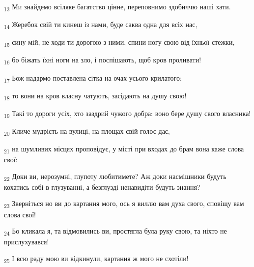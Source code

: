 \begin{tcolorbox}
\textsubscript{13} Ми знайдемо всіляке багатство цінне, переповнимо здобиччю наші хати.
\end{tcolorbox}
\begin{tcolorbox}
\textsubscript{14} Жеребок свій ти кинеш із нами, буде саква одна для всіх нас,
\end{tcolorbox}
\begin{tcolorbox}
\textsubscript{15} сину мій, не ходи ти дорогою з ними, спини ногу свою від їхньої стежки,
\end{tcolorbox}
\begin{tcolorbox}
\textsubscript{16} бо біжать їхні ноги на зло, і поспішають, щоб кров проливати!
\end{tcolorbox}
\begin{tcolorbox}
\textsubscript{17} Бож надармо поставлена сітка на очах усього крилатого:
\end{tcolorbox}
\begin{tcolorbox}
\textsubscript{18} то вони на кров власну чатують, засідають на душу свою!
\end{tcolorbox}
\begin{tcolorbox}
\textsubscript{19} Такі то дороги усіх, хто заздрий чужого добра: воно бере душу свого власника!
\end{tcolorbox}
\begin{tcolorbox}
\textsubscript{20} Кличе мудрість на вулиці, на площах свій голос дає,
\end{tcolorbox}
\begin{tcolorbox}
\textsubscript{21} на шумливих місцях проповідує, у місті при входах до брам вона каже слова свої:
\end{tcolorbox}
\begin{tcolorbox}
\textsubscript{22} Доки ви, нерозумні, глупоту любитимете? Аж доки насмішники будуть кохатись собі в глузуванні, а безглузді ненавидіти будуть знання?
\end{tcolorbox}
\begin{tcolorbox}
\textsubscript{23} Зверніться но ви до картання мого, ось я виллю вам духа свого, сповіщу вам слова свої!
\end{tcolorbox}
\begin{tcolorbox}
\textsubscript{24} Бо кликала я, та відмовились ви, простягла була руку свою, та ніхто не прислухувався!
\end{tcolorbox}
\begin{tcolorbox}
\textsubscript{25} І всю раду мою ви відкинули, картання ж мого не схотіли!
\end{tcolorbox}
